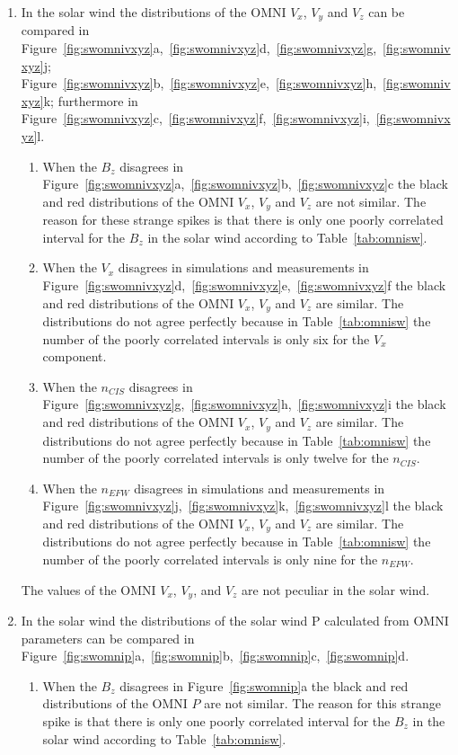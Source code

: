 \documentclass[draft]{agujournal2019}
\begin{document}
\begin{enumerate}
\item In the solar wind the distributions of the OMNI $V_{x}$, $V_{y}$ and $V_{z}$ can be compared in Figure~\ref{fig:swomnivxyz}a,~\ref{fig:swomnivxyz}d,~\ref{fig:swomnivxyz}g,~\ref{fig:swomnivxyz}j; Figure~\ref{fig:swomnivxyz}b,~\ref{fig:swomnivxyz}e,~\ref{fig:swomnivxyz}h,~\ref{fig:swomnivxyz}k; furthermore in Figure~\ref{fig:swomnivxyz}c,~\ref{fig:swomnivxyz}f,~\ref{fig:swomnivxyz}i,~\ref{fig:swomnivxyz}l.
\begin{enumerate} 
\item When the $B_{z}$ disagrees in Figure~\ref{fig:swomnivxyz}a,~\ref{fig:swomnivxyz}b,~\ref{fig:swomnivxyz}c the black and red distributions of the OMNI $V_{x}$, $V_{y}$ and $V_{z}$ are not similar. The reason for these strange spikes is that there is only one poorly correlated interval for the $B_{z}$ in the solar wind according to Table~\ref{tab:omnisw}.

\item When the $V_{x}$ disagrees in simulations and measurements in Figure~\ref{fig:swomnivxyz}d,~\ref{fig:swomnivxyz}e,~\ref{fig:swomnivxyz}f the black and red distributions of the OMNI $V_{x}$, $V_{y}$ and $V_{z}$ are similar. The distributions do not agree perfectly because in Table~\ref{tab:omnisw} the number of the poorly correlated intervals is only six for the $V_{x}$ component.
 
\item When the $n_{CIS}$ disagrees in Figure~\ref{fig:swomnivxyz}g,~\ref{fig:swomnivxyz}h,~\ref{fig:swomnivxyz}i the black and red distributions of the OMNI $V_{x}$, $V_{y}$ and $V_{z}$ are similar. The distributions do not agree perfectly because in Table~\ref{tab:omnisw} the number of the poorly correlated intervals is only twelve for the $n_{CIS}$.

\item When the $n_{EFW}$ disagrees in simulations and measurements in Figure~\ref{fig:swomnivxyz}j,~\ref{fig:swomnivxyz}k,~\ref{fig:swomnivxyz}l the black and red distributions of the OMNI $V_{x}$, $V_{y}$ and $V_{z}$ are similar. The distributions do not agree perfectly because in Table~\ref{tab:omnisw} the number of the poorly correlated intervals is only nine for the $n_{EFW}$.
\end{enumerate}
The values of the OMNI $V_{x}$, $V_{y}$, and $V_{z}$ are not peculiar in the solar wind. 
 
\item In the solar wind the distributions of the solar wind P calculated from OMNI parameters can be compared in Figure~\ref{fig:swomnip}a,~\ref{fig:swomnip}b,~\ref{fig:swomnip}c,~\ref{fig:swomnip}d.
\begin{enumerate}
\item When the $B_{z}$ disagrees in Figure~\ref{fig:swomnip}a the black and red distributions of the OMNI $P$ are not similar. The reason for this strange spike is that there is only one poorly correlated interval for the $B_{z}$ in the solar wind according to Table~\ref{tab:omnisw}.
  

\end{enumerate}
\end{enumerate}
\end{document}
